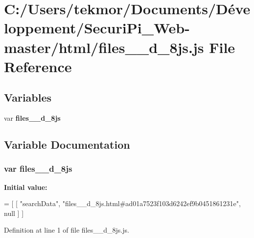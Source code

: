 \section{C\+:/\+Users/tekmor/\+Documents/\+Développement/\+Securi\+Pi\+\_\+\+Web-\/master/html/files\+\_\+\+\_\+d\+\_\+8js.js File Reference}
\label{files____d__8js_8js}
\subsection*{Variables}
\begin{DoxyCompactItemize}
\item 
var {\bf files\+\_\+\+\_\+d\+\_\+8js}
\end{DoxyCompactItemize}


\subsection{Variable Documentation}
\subsubsection[{files\+\_\+\+\_\+d\+\_\+8js}]{\setlength{\rightskip}{0pt plus 5cm}var files\+\_\+\+\_\+d\+\_\+8js}\label{files____d__8js_8js_ab0bdab399021b663851725fb60ee5c50}
{\bfseries Initial value\+:}
\begin{DoxyCode}
=
[
    [ \textcolor{stringliteral}{"searchData"}, \textcolor{stringliteral}{"files\_\_d\_8js.html#ad01a7523f103d6242ef9b0451861231e"}, null ]
]
\end{DoxyCode}


Definition at line 1 of file files\+\_\+\+\_\+d\+\_\+8js.\+js.

